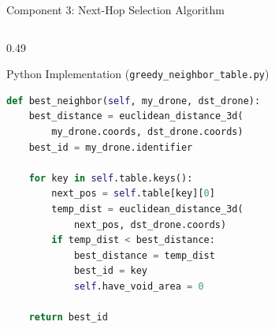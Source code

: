 \documentclass[aspectratio=169,10pt]{beamer}
\begin{document}
\begin{frame}[fragile]{Component 3: Next-Hop Selection Algorithm}
\begin{columns}[T]
    \begin{column}{0.49\textwidth}
      \begin{exampleblock}{Python Implementation (\texttt{greedy\_neighbor\_table.py})}
\begin{lstlisting}[language=Python]
def best_neighbor(self, my_drone, dst_drone):
    best_distance = euclidean_distance_3d(
        my_drone.coords, dst_drone.coords)
    best_id = my_drone.identifier

    for key in self.table.keys():
        next_pos = self.table[key][0]
        temp_dist = euclidean_distance_3d(
            next_pos, dst_drone.coords)
        if temp_dist < best_distance:
            best_distance = temp_dist
            best_id = key
            self.have_void_area = 0

    return best_id
\end{lstlisting}
      \end{exampleblock}
    \end{column}
  \end{columns}
\end{frame}
\end{document}
